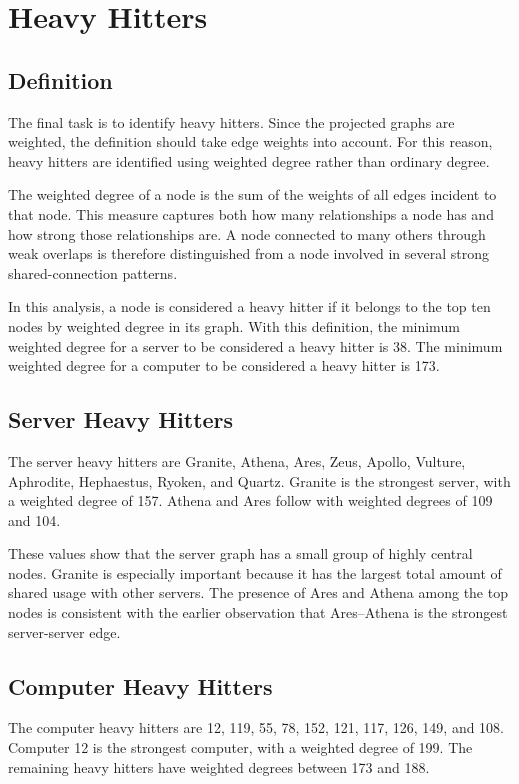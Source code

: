 \documentclass[11pt,a4paper]{article}
\begin{document}
\section{Heavy Hitters}

\subsection{Definition}

The final task is to identify heavy hitters. Since the projected graphs are weighted, the definition should take edge weights into account. For this reason, heavy hitters are identified using weighted degree rather than ordinary degree.

The weighted degree of a node is the sum of the weights of all edges incident to that node. This measure captures both how many relationships a node has and how strong those relationships are. A node connected to many others through weak overlaps is therefore distinguished from a node involved in several strong shared-connection patterns.

In this analysis, a node is considered a heavy hitter if it belongs to the top ten nodes by weighted degree in its graph. With this definition, the minimum weighted degree for a server to be considered a heavy hitter is 38. The minimum weighted degree for a computer to be considered a heavy hitter is 173.

\subsection{Server Heavy Hitters}

The server heavy hitters are Granite, Athena, Ares, Zeus, Apollo, Vulture, Aphrodite, Hephaestus, Ryoken, and Quartz. Granite is the strongest server, with a weighted degree of 157. Athena and Ares follow with weighted degrees of 109 and 104.

These values show that the server graph has a small group of highly central nodes. Granite is especially important because it has the largest total amount of shared usage with other servers. The presence of Ares and Athena among the top nodes is consistent with the earlier observation that Ares--Athena is the strongest server-server edge.

\subsection{Computer Heavy Hitters}

The computer heavy hitters are 12, 119, 55, 78, 152, 121, 117, 126, 149, and 108. Computer 12 is the strongest computer, with a weighted degree of 199. The remaining heavy hitters have weighted degrees between 173 and 188.
\end{document}
